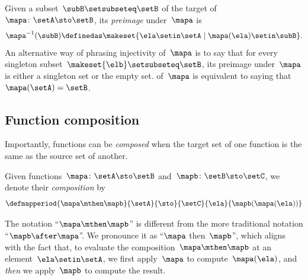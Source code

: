 Given a subset~$\subB \setsubseteq \setB$ of the target of $\mapa\colon \setA \sto \setB$, its \emph{preimage} under~$\mapa$ is
\begin{equation}
    \mapa^{-1}(\subB) \definedas \makeset{ \ela \setin\setA \mid \mapa(\ela) \setin\subB }.
\end{equation}
An alternative way of phrasing injectivity of~$\mapa$ is to say that for every singleton subset~$\makeset{ \elb } \setsubseteq \setB$, its preimage under~$\mapa$ is either a singleton set or the empty set.
 of~$\mapa$ is equivalent to saying that~$\mapa(\setA) = \setB$.

\subsection{Function composition}

\begin{marginfigure}
    \centering
    \caption{Two functions with corresponding target and source sets.}
    \label{fig:function_comp_figure}
\end{marginfigure}

\begin{marginfigure}
    \centering
    \caption{The  of two functions.}
    \label{fig:function_comp_figure_b}
\end{marginfigure}

Importantly, functions can be \emph{composed} when the target set of one function is the same as the source set of another.
\begin{ctdefinition}
    \label{def:composition-of-functions}
    Given functions~$\mapa\colon \setA \sto \setB$ and~$\mapb \colon \setB \sto \setC$, we denote their \emph{composition} by
    \begin{equation}
        \label{eq:composition-notation-functions}
        \defmapperiod{
            \mapa \mthen \mapb
        }{
            \setA
        }{
            \sto
        }{
            \setC
        }{
            \ela
        }{
            \mapb(\mapa(\ela))
        }
    \end{equation}
\end{ctdefinition}

The notation ``$\mapa \mthen \mapb$'' is different from the more traditional notation ``$\mapb \after \mapa$''.
We pronounce it as ``$\mapa$ then~$\mapb$'', which aligns with the fact that, to evaluate the composition~$\mapa \mthen \mapb$ at an element~$\ela \setin\setA$, we first apply~$\mapa$ to compute~$\mapa(\ela)$, and \emph{then} we apply~$\mapb$ to compute the result.


